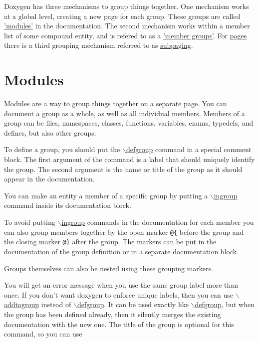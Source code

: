 Doxygen has three mechanisms to group things together. One mechanism works at a global level, creating a new page for each group. These groups are called \hyperlink{grouping_modules}{'modules'} in the documentation. The second mechanism works within a member list of some compound entity, and is refered to as a \hyperlink{grouping_memgroup}{'member groups'}. For \hyperlink{commands_cmdpage}{pages} there is a third grouping mechanism referred to as \hyperlink{grouping_subpaging}{subpaging}.\hypertarget{grouping_modules}{}\section{Modules}\label{grouping_modules}
Modules are a way to group things together on a separate page. You can document a group as a whole, as well as all individual members. Members of a group can be files, namespaces, classes, functions, variables, enums, typedefs, and defines, but also other groups.

To define a group, you should put the \hyperlink{commands_cmddefgroup}{$\backslash$defgroup} command in a special comment block. The first argument of the command is a label that should uniquely identify the group. The second argument is the name or title of the group as it should appear in the documentation.

You can make an entity a member of a specific group by putting a \hyperlink{commands_cmdingroup}{$\backslash$ingroup} command inside its documentation block.

To avoid putting \hyperlink{commands_cmdingroup}{$\backslash$ingroup} commands in the documentation for each member you can also group members together by the open marker {\tt @\{} before the group and the closing marker {\tt @\}} after the group. The markers can be put in the documentation of the group definition or in a separate documentation block.

Groups themselves can also be nested using these grouping markers.

You will get an error message when you use the same group label more than once. If you don't want doxygen to enforce unique labels, then you can use \hyperlink{commands_cmdaddtogroup}{$\backslash$addtogroup} instead of \hyperlink{commands_cmddefgroup}{$\backslash$defgroup}. It can be used exactly like \hyperlink{commands_cmddefgroup}{$\backslash$defgroup}, but when the group has been defined already, then it silently merges the existing documentation with the new one. The title of the group is optional for this command, so you can use 

